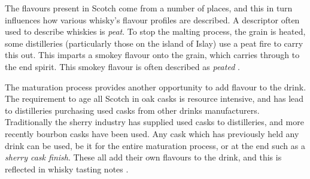The flavours present in Scotch come from a number of places, and this in turn influences how various whisky's
flavour profiles are described.  A descriptor often used to describe whiskies is \emph{peat}.
To stop the malting process, the grain is heated, some distilleries (particularly those on the island of Islay) use
a peat fire to carry this out.  This imparts a smokey flavour onto the grain, which carries through to the end spirit.
This smokey flavour is often described as \emph{peated} \cite{Jacques2003, Bathgate2019}.

The maturation process provides another opportunity to add flavour to the drink.  The requirement to age all Scotch in 
oak casks is resource intensive, and has lead to distilleries purchasing used casks from other drinks manufacturers.
Traditionally the sherry industry has supplied used casks to distilleries, and more recently bourbon casks have been 
used.  Any cask which has previously held any drink can be used, be it for the entire maturation process, or at the end
such as a \emph{sherry cask finish}.  These all add their own flavours to the drink, and this is reflected in whisky
tasting notes \cite{Jacques2003, Mosedale1998}.